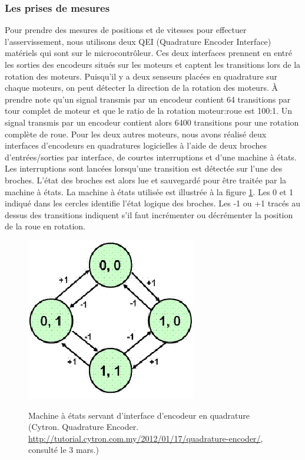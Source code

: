 \subsubsection{Les prises de mesures}
\label{asservissement_mesures}
Pour prendre des mesures de positions et de vitesses pour effectuer l'asservissement, nous utilisons deux QEI (Quadrature Encoder Interface) matériels qui sont sur le microcontrôleur. Ces deux interfaces prennent en entré les sorties des encodeurs situés sur les moteurs et captent les transitions lors de la rotation des moteurs. Puisqu'il y a deux senseurs placées en quadrature sur chaque moteurs, on peut détecter la direction de la rotation des moteurs. À prendre note qu'un signal transmis par un encodeur contient 64 transitions par tour complet de moteur et que le ratio de la rotation moteur:roue est 100:1. Un signal transmis par un encodeur contient alors 6400 transitions pour une rotation complète de roue. Pour les deux autres moteurs, nous avons réalisé deux interfaces d'encodeurs en quadratures logicielles à l'aide de deux broches d'entrées/sorties par interface, de courtes interruptions et d'une machine à états. Les interruptions sont lancées lorsqu'une transition est détectée sur l'une des broches. L'état des broches est alors lue et sauvegardé pour être traitée par la machine à états. La machine à états utilisée est illustrée à la figure \ref{fig:cytron_machine_etats}. Les 0 et 1 indiqué dans les cercles identifie l'état logique des broches. Les -1 ou +1 tracés au dessus des transitions indiquent s'il faut incrémenter ou décrémenter la position de la roue en rotation.
\begin{figure}[htbp]
\centering
\includegraphics[scale=0.7]{fig/cytron_machine_etats.png}
\label{fig:cytron_machine_etats}
\caption{Machine à états servant d'interface d'encodeur en quadrature (Cytron. Quadrature Encoder. \url{http://tutorial.cytron.com.my/2012/01/17/quadrature-encoder/}, consulté le 3 mars.)}
\end{figure}

